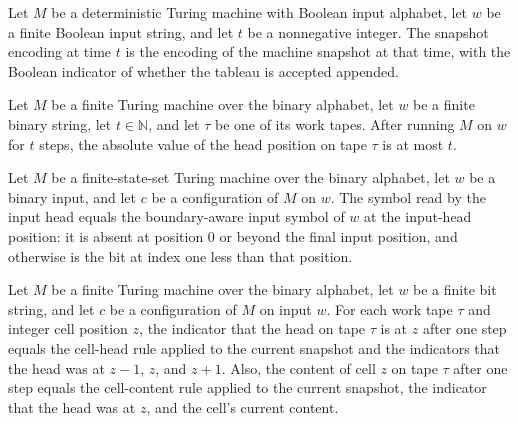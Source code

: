 \begin{definition}
\label{Complexity.snapExp}
\leanok
{}
Let $M$ be a deterministic Turing machine with Boolean input alphabet, let $w$ be a
finite Boolean input string, and let $t$ be a nonnegative integer. The snapshot encoding
at time $t$ is the encoding of the machine snapshot at that time, with the Boolean
indicator of whether the tableau is accepted appended.
\end{definition}

\begin{theorem}
\label{Complexity.abs_workTapePos_le}
\leanok
{}
Let $M$ be a finite Turing machine over the binary alphabet, let $w$ be a finite binary
string, let $t\in\mathbb{N}$, and let $\tau$ be one of its work tapes. After running $M$
on $w$ for $t$ steps, the absolute value of the head position on tape $\tau$ is at most
$t$.
\end{theorem}

\begin{theorem}
\label{Complexity.inputSymbol_eq_inputBitAt}
\leanok
{}
Let $M$ be a finite-state-set Turing machine over the binary alphabet, let $w$ be a
binary input, and let $c$ be a configuration of $M$ on $w$. The symbol read by the input
head equals the boundary-aware input symbol of $w$ at the input-head position: it is
absent at position $0$ or beyond the final input position, and otherwise is the bit at
index one less than that position.
\end{theorem}

\begin{theorem}
\label{Complexity.cell_step}
\leanok
{}
Let $M$ be a finite Turing machine over the binary alphabet, let $w$ be a finite bit
string, and let $c$ be a configuration of $M$ on input $w$. For each work tape $\tau$
and integer cell position $z$, the indicator that the head on tape $\tau$ is at $z$
after one step equals the cell-head rule applied to the current snapshot and the
indicators that the head was at $z-1$, $z$, and $z+1$. Also, the content of cell $z$ on
tape $\tau$ after one step equals the cell-content rule applied to the current snapshot,
the indicator that the head was at $z$, and the cell's current content.
\end{theorem}

